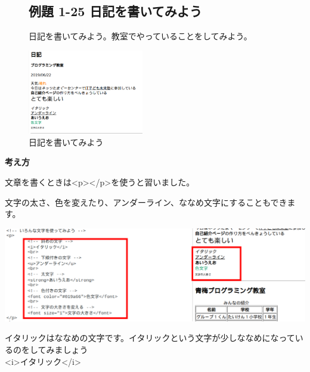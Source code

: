 \centering
\begin{figure}
  \subsection{例題 1-25 日記を書いてみよう}
  日記を書いてみよう。教室でやっていることをしてみよう。

  \centering
  \begin{minipage}{6.32cm}
    {\upshape
      \includegraphics[width=0.45\textwidth]{text01-img/textbook-img185.png}
      \newline
      \caption{日記を書いてみよう}
    }
  \end{minipage}    
\end{figure}

\bigskip

\flushleft
\textbf{考え方}



文章を書くときは{\textless}p{\textgreater}{\textless}/p{\textgreater}を使うと習いました。

文字の太さ、色を変えたり、アンダーライン、ななめ文字にすることもできます。

\centering
\includegraphics[width=14.284cm]{text01-img/textbook-img186.png}

\bigskip

\flushleft

イタリックはななめの文字です。イタリックという文字が少しななめになっているのをしてみましょう\\
{\textless}i{\textgreater}イタリック{\textless}/i{\textgreater}\\

